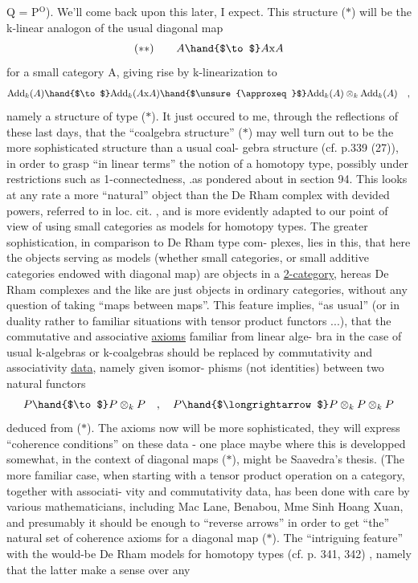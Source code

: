 
Q = P$^{\mathrm{O}}$). We'll come back upon this later, I expect.  This structure
($\ast$) will be the k-linear analogon of the usual diagonal map
\[ (\ast\ast) \qquad A \hand{$\to$} A\mathrm{x}A \]
for a small category A,  giving rise by k-linearization to
\[ \mathrm{Add}_k(A) \hand{$\to$} \mathrm{Add}_k(A\mathrm{x}A) \hand{$\unsure{\approxeq}$} \mathrm{Add}_k(A)\otimes_k\mathrm{Add}_k(A) \quad , \]
namely a structure of type ($\ast$).  It just occured to me,  through the
reflections of these last days,  that the ``coalgebra structure'' ($\ast$) may
well turn out  to be the more sophisticated structure than a usual coal-%
gebra structure (cf. p.339  (27)),  in order to grasp ``in linear terms''
the notion of a homotopy type,  possibly under restrictions such as
1-connectedness, .as pondered about in section 94.  This looks at any
rate a more ``natural'' object than the De Rham complex with devided
powers, referred to in loc. cit. ,  and is more evidently adapted to
our point of view of using small categories as models for homotopy
types.  The greater sophistication,  in comparison to De Rham type com-%
plexes, lies in this,  that here the objects serving as models (whether
small categories,  or small additive categories endowed with  diagonal
map) are objects in a \uline{2-category},  hereas De Rham complexes and the 
like are just objects in ordinary categories,  without any question of
taking ``maps between maps''.  This feature implies, ``as usual'' (or in
duality rather to familiar situations with tensor product functors ...),
that the  commutative and associative \uline{axioms}  familiar from linear alge-%
bra\hand{,} \hand{(}in the case of usual k-algebras or k-coalgebras\hand{)}\hand{,} should be
replaced by commutativity and associativity \uline{data},  namely given isomor-%
phisms (not identities) between  two natural functors
\[ P \hand{$\to$} P\otimes_k P \quad , \quad P \hand{$\longrightarrow$} P\otimes_k P\otimes_k P \]
deduced from ($\ast$).  The axioms now will be more sophisticated,  they will
express ``coherence conditions'' on these data  -  one place maybe where
this is developped somewhat,  in the context of diagonal maps ($\ast$),
might be Saavedra's thesis.  (The  more familiar case,  when starting
with a tensor product operation on a category,  together with associati-%
vity and  commutativity data,  has been done with  care by various
mathematicians,  including Mac Lane, Benabou,  Mme Sinh Hoang Xuan,
and presumably it should be enough to ``reverse arrows'' in order to get
``the'' natural set of coherence axioms for a diagonal map ($\ast$)\hand{)}.  The
``intriguing feature''  with the would-be De Rham models for homotopy
types (cf. p. 341, 342) ,  namely that the latter make a sense over any

